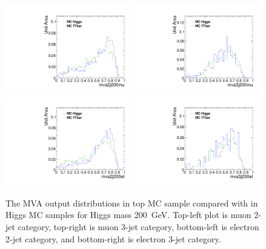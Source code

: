 \begin{figure}[!t]
  \centering
  \includegraphics[width=0.49\textwidth]{figs/cl-mva2j200mu-mvaTopvsHiggs.pdf}
  \includegraphics[width=0.49\textwidth]{figs/cl-mva3j200mu-mvaTopvsHiggs.pdf}
  \includegraphics[width=0.49\textwidth]{figs/cl-mva2j200el-mvaTopvsHiggs.pdf}
  \includegraphics[width=0.49\textwidth]{figs/cl-mva3j200el-mvaTopvsHiggs.pdf}
  \caption{\label{fig:mva:sigvsttbar-mva2j200}The MVA output
    distributions in top MC sample compared with in Higgs MC
    samples for Higgs mass 200~GeV. Top-left plot is muon 2-jet category,
    top-right is muon 3-jet category, bottom-left is electron 2-jet
    category, and bottom-right is electron 3-jet category. }
\end{figure}

